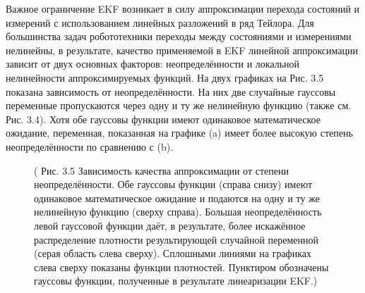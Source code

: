 \documentclass[10pt,a4paper]{article}
\begin{document}
Важное ограничение EKF возникает в силу аппроксимации перехода состояний и измерений с использованием линейных разложений в ряд Тейлора. Для большинства задач робототехники переходы между состояниями и измерениями нелинейны, в результате, качество применяемой в EKF линейной аппроксимации зависит от двух основных факторов:  неопределённости и  локальной нелинейности аппроксимируемых функций. На двух графиках на Рис. 3.5 показана зависимость от неопределённости. На них две случайные гауссовы переменные пропускаются через одну и ту же нелинейную функцию (также см. Рис. 3.4). Хотя обе гауссовы функции имеют одинаковое математическое ожидание, переменная, показанная на графике (a) имеет более высокую степень неопределённости по сравнению с (b).\\
\begin{figure}[H]
	\caption{ (  Рис. 3.5 Зависимость качества аппроксимации от степени неопределённости. Обе гауссовы функции (справа снизу) имеют одинаковое математическое ожидание и подаются на одну и ту же нелинейную функцию (сверху справа). Большая неопределённость левой гауссовой функции даёт, в результате, более искажённое распределение плотности результирующей случайной переменной (серая область слева сверху). Сплошными линиями на графиках слева сверху показаны функции плотностей. Пунктиром обозначены гауссовы функции, полученные в результате линеаризации EKF.)}
	\label{fig:35orig}
\end{figure}  
\end{document}

